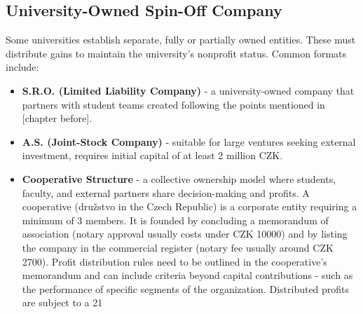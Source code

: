 \subsection{University-Owned Spin-Off Company}
Some universities establish separate, fully or partially owned entities. These must distribute gains to maintain the university’s nonprofit status. Common formats include:
\begin{itemize}
    \item \textbf{S.R.O. (Limited Liability Company)} - a university-owned company that partners with student teams created following the points mentioned in [chapter before].
    \item \textbf{A.S. (Joint-Stock Company)} - suitable for large ventures seeking external investment, requires initial capital of at least 2 million CZK.
    \item \textbf{Cooperative Structure }- a collective ownership model where students, faculty, and external partners share decision-making and profits. A cooperative (družstvo in the Czech Republic) is a corporate entity requiring a minimum of 3 members. It is founded by concluding a memorandum of association (notary approval usually costs under CZK 10000) and by listing the company in the commercial register (notary fee usually around CZK 2700). Profit distribution rules need to be outlined in the cooperative’s memorandum and can include criteria beyond capital contributions  - such as the performance of specific segments of the organization. Distributed profits are subject to a 21%
\end{itemize}
